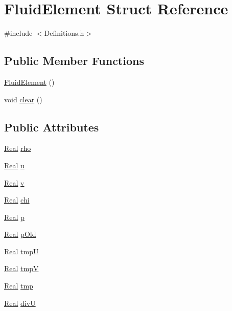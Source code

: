 \hypertarget{struct_fluid_element}{}\section{Fluid\+Element Struct Reference}
\label{struct_fluid_element}


{\ttfamily \#include $<$Definitions.\+h$>$}

\subsection*{Public Member Functions}
\begin{DoxyCompactItemize}
\item 
\hyperlink{struct_fluid_element_aaae89c098314ffcb5cd5a32e500d691c}{Fluid\+Element} ()
\item 
void \hyperlink{struct_fluid_element_ada7d116e06c17828ff57e07653491623}{clear} ()
\end{DoxyCompactItemize}
\subsection*{Public Attributes}
\begin{DoxyCompactItemize}
\item 
\hyperlink{_h_d_f5_dumper_8h_a445a5f0e2a34c9d97d69a3c2d1957907}{Real} \hyperlink{struct_fluid_element_ae4622a87eca42f93f5d979afcf88ca43}{rho}
\item 
\hyperlink{_h_d_f5_dumper_8h_a445a5f0e2a34c9d97d69a3c2d1957907}{Real} \hyperlink{struct_fluid_element_a3b438ee50f00308195df193026d81811}{u}
\item 
\hyperlink{_h_d_f5_dumper_8h_a445a5f0e2a34c9d97d69a3c2d1957907}{Real} \hyperlink{struct_fluid_element_a6a99b2af6aa6cdba2f01ea8802da1749}{v}
\item 
\hyperlink{_h_d_f5_dumper_8h_a445a5f0e2a34c9d97d69a3c2d1957907}{Real} \hyperlink{struct_fluid_element_a17fa879397c1321c63b476c24cc90113}{chi}
\item 
\hyperlink{_h_d_f5_dumper_8h_a445a5f0e2a34c9d97d69a3c2d1957907}{Real} \hyperlink{struct_fluid_element_ad2870c62559df6f040835159ec6703da}{p}
\item 
\hyperlink{_h_d_f5_dumper_8h_a445a5f0e2a34c9d97d69a3c2d1957907}{Real} \hyperlink{struct_fluid_element_ae68b8bf806c59b2c65127900ae7db232}{p\+Old}
\item 
\hyperlink{_h_d_f5_dumper_8h_a445a5f0e2a34c9d97d69a3c2d1957907}{Real} \hyperlink{struct_fluid_element_aa0d1bf5231c4b022a628d140b1b2c5d9}{tmp\+U}
\item 
\hyperlink{_h_d_f5_dumper_8h_a445a5f0e2a34c9d97d69a3c2d1957907}{Real} \hyperlink{struct_fluid_element_a46027ac92e12443c175763fc0724a93c}{tmp\+V}
\item 
\hyperlink{_h_d_f5_dumper_8h_a445a5f0e2a34c9d97d69a3c2d1957907}{Real} \hyperlink{struct_fluid_element_a5fdbb5dcc82bf5451278656c530a5eea}{tmp}
\item 
\hyperlink{_h_d_f5_dumper_8h_a445a5f0e2a34c9d97d69a3c2d1957907}{Real} \hyperlink{struct_fluid_element_aba2e77832126f3c461bde1230bef0741}{div\+U}
\end{DoxyCompactItemize}


